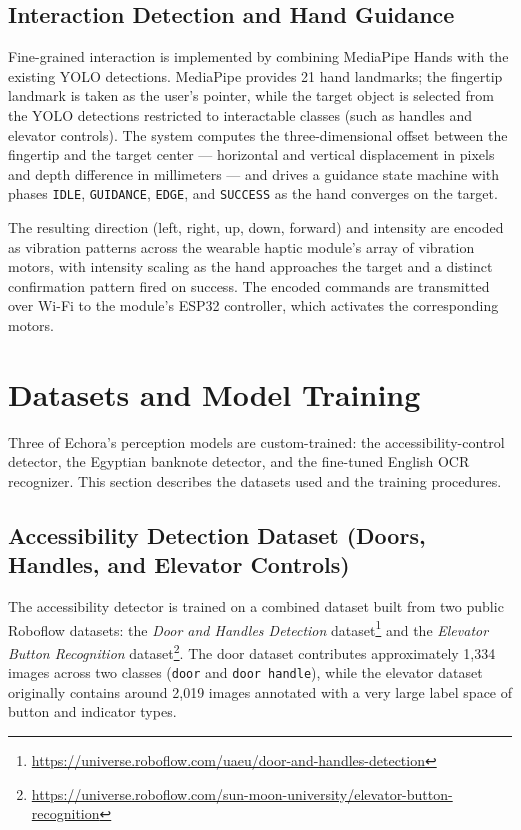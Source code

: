 \subsection{Interaction Detection and Hand Guidance}

Fine-grained interaction is implemented by combining MediaPipe Hands with the existing YOLO detections. MediaPipe provides 21 hand landmarks; the fingertip landmark is taken as the user's pointer, while the target object is selected from the YOLO detections restricted to interactable classes (such as handles and elevator controls). The system computes the three-dimensional offset between the fingertip and the target center --- horizontal and vertical displacement in pixels and depth difference in millimeters --- and drives a guidance state machine with phases \texttt{IDLE}, \texttt{GUIDANCE}, \texttt{EDGE}, and \texttt{SUCCESS} as the hand converges on the target.

The resulting direction (left, right, up, down, forward) and intensity are encoded as vibration patterns across the wearable haptic module's array of vibration motors, with intensity scaling as the hand approaches the target and a distinct confirmation pattern fired on success. The encoded commands are transmitted over Wi-Fi to the module's ESP32 controller, which activates the corresponding motors.

\section{Datasets and Model Training}
\label{sec:datasets}

Three of Echora's perception models are custom-trained: the accessibility-control detector, the Egyptian banknote detector, and the fine-tuned English OCR recognizer. This section describes the datasets used and the training procedures.

\subsection{Accessibility Detection Dataset (Doors, Handles, and Elevator Controls)}

The accessibility detector is trained on a combined dataset built from two public Roboflow datasets: the \emph{Door and Handles Detection} dataset\footnote{\url{https://universe.roboflow.com/uaeu/door-and-handles-detection}} and the \emph{Elevator Button Recognition} dataset\footnote{\url{https://universe.roboflow.com/sun-moon-university/elevator-button-recognition}}. The door dataset contributes approximately 1,334 images across two classes (\texttt{door} and \texttt{door handle}), while the elevator dataset originally contains around 2,019 images annotated with a very large label space of button and indicator types.

